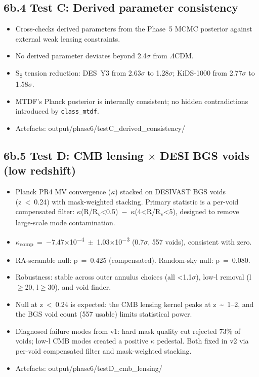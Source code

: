 \documentclass[11pt,a4paper]{article}
\begin{document}
\subsection{6b.4 Test C: Derived parameter consistency}
\begin{itemize}
  \item Cross-checks derived parameters from the Phase~5 MCMC posterior against external weak lensing constraints.
  \item No derived parameter deviates beyond 2.4$\sigma$ from $\Lambda$CDM.
  \item S\textsubscript{8} tension reduction: DES~Y3 from 2.63$\sigma$ to 1.28$\sigma$; KiDS-1000 from 2.77$\sigma$ to 1.58$\sigma$.
  \item MTDF's Planck posterior is internally consistent; no hidden contradictions introduced by \texttt{class\_\allowbreak{}mtdf}.
  \item Artefacts: output/\allowbreak{}phase6/\allowbreak{}testC\_\allowbreak{}derived\_\allowbreak{}consistency/\allowbreak{}
\end{itemize}

\subsection{6b.5 Test D: CMB lensing $\times$ DESI BGS voids (low redshift)}
\begin{itemize}
  \item Planck PR4 MV convergence ($\kappa$) stacked on DESIVAST BGS voids (z~<~0.24) with mask-weighted stacking. Primary statistic is a per-void compensated filter: $\kappa$(R/\allowbreak{}R\textsubscript{v}<0.5)~$-$~$\kappa$(4<R/\allowbreak{}R\textsubscript{v}<5), designed to remove large-scale mode contamination.
  \item $\kappa$\textsubscript{comp}~=~$-$7.47$\times$10\textsuperscript{$-$4}~$\pm$~1.03$\times$10\textsuperscript{$-$3} (0.7$\sigma$, 557 voids), consistent with zero.
  \item RA-scramble null: p~=~0.425 (compensated). Random-sky null: p~=~0.080.
  \item Robustness: stable across outer annulus choices (all <1.1$\sigma$), low-l removal (l$\ge$20, l$\ge$30), and void finder.
  \item Null at z~<~0.24 is expected: the CMB lensing kernel peaks at z~\~{}~1--2, and the BGS void count (557 usable) limits statistical power.
  \item Diagnosed failure modes from v1: hard mask quality cut rejected 73\% of voids; low-l CMB modes created a positive $\kappa$ pedestal. Both fixed in v2 via per-void compensated filter and mask-weighted stacking.
  \item Artefacts: output/\allowbreak{}phase6/\allowbreak{}testD\_\allowbreak{}cmb\_\allowbreak{}lensing/\allowbreak{}
\end{itemize}
\end{document}
